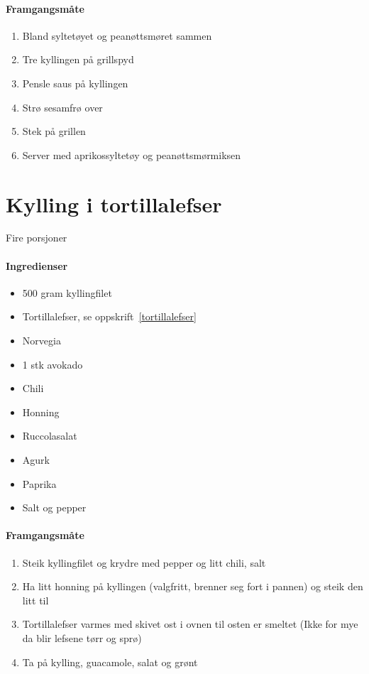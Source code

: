 \documentclass[12pt,a4paper]{book}
\begin{document}
\paragraph{Framgangsmåte}
\begin{enumerate}[noitemsep]
	\item Bland syltetøyet og peanøttsmøret sammen
	\item Tre kyllingen på grillspyd
	\item Pensle saus på kyllingen
	\item Strø sesamfrø over
	\item Stek på grillen
	\item Server med aprikossyltetøy og peanøttsmørmiksen
\end{enumerate}
\clearpage{}
\clearpage{}\section{﻿Kylling i tortillalefser}
\label{kyllingtortilla}

Fire porsjoner

\paragraph{Ingredienser}
\begin{itemize}[noitemsep]
	\item 500 gram kyllingfilet
		\item Tortillalefser, se oppskrift~\ref{tortillalefser}
		\item Norvegia
		\item 1 stk avokado
		\item Chili
		\item Honning
		\item Ruccolasalat
		\item Agurk
		\item Paprika
		\item Salt og pepper
\end{itemize}

\paragraph{Framgangsmåte}
\begin{enumerate}[noitemsep]
	\item Steik kyllingfilet og krydre med pepper og litt chili, salt
	\item Ha litt honning på kyllingen (valgfritt, brenner seg fort i pannen) og steik den litt til
	\item Tortillalefser varmes med skivet ost i ovnen til osten er smeltet (Ikke for mye da blir lefsene tørr og sprø)
	\item Ta på kylling, guacamole, salat og grønt
\end{enumerate}
\end{document}
